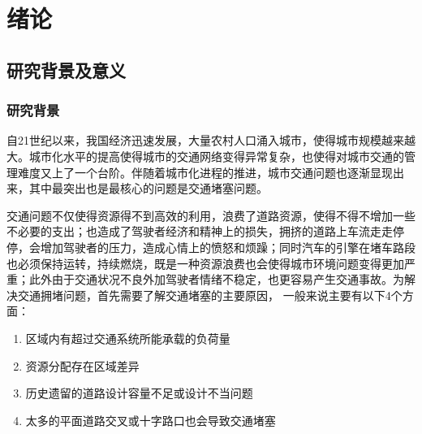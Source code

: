 \chapter{绪论}\label{ch:绪论}


\section{研究背景及意义}\label{sec:研究背景及意义}

\subsection{研究背景}\label{subsec:研究背景}

自21世纪以来，我国经济迅速发展，大量农村人口涌入城市，使得城市规模越来越大。城市化水平的提高使得城市的交通网络变得异常复杂，也使得对城市交通的管理难度又上了一个台阶。伴随着城市化进程的推进，城市交通问题也逐渐显现出来，其中最突出也是最核心的问题是交通堵塞问题。

交通问题不仅使得资源得不到高效的利用，浪费了道路资源，使得不得不增加一些不必要的支出；也造成了驾驶者经济和精神上的损失，拥挤的道路上车流走走停停，会增加驾驶者的压力，造成心情上的愤怒和烦躁；同时汽车的引擎在堵车路段也必须保持运转，持续燃烧，既是一种资源浪费也会使得城市环境问题变得更加严重；此外由于交通状况不良外加驾驶者情绪不稳定，也更容易产生交通事故。为解决交通拥堵问题，首先需要了解交通堵塞的主要原因，
一般来说主要有以下4个方面：
\begin{enumerate}%
    \item 区域内有超过交通系统所能承载的负荷量
    \item 资源分配存在区域差异
    \item 历史遗留的道路设计容量不足或设计不当问题
    \item 太多的平面道路交叉或十字路口也会导致交通堵塞
\end{enumerate}


